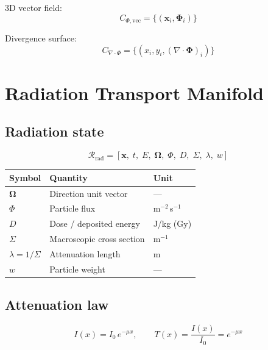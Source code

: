 \documentclass[11pt, a4paper, oneside]{article}
\newcommand{\xvec}{\mathbf{x}}
\newcommand{\Phivec}{\bm{\Phi}}
\newcommand{\Omvec}{\bm{\Omega}}         %
\begin{document}
3D vector field:
\begin{equation}
  C_{\Phi,\mathrm{vec}} = \{(\xvec_i, \Phivec_i)\}
  \label{eq:c_fluxvec}
\end{equation}

Divergence surface:
\begin{equation}
  C_{\nabla\cdot\Phi} = \{(x_i, y_i, (\nabla\cdot\Phivec)_i)\}
  \label{eq:c_div}
\end{equation}

\section{Radiation Transport Manifold}
\label{sec:radiation}

\subsection{Radiation state}

\begin{equation}
  \mathcal{R}_{\mathrm{rad}} = [\xvec,\; t,\; E,\; \Omvec,\;
                                  \Phi,\; D,\; \Sigma,\; \lambda,\; w]
  \label{eq:rad_state}
\end{equation}

\begin{center}
\begin{tabular}{lll}
  \toprule
  Symbol & Quantity & Unit \\
  \midrule
  $\Omvec$ & Direction unit vector & --- \\
  $\Phi$   & Particle flux         & m$^{-2}$\,s$^{-1}$ \\
  $D$      & Dose / deposited energy & J/kg (Gy) \\
  $\Sigma$ & Macroscopic cross section & m$^{-1}$ \\
  $\lambda = 1/\Sigma$ & Attenuation length & m \\
  $w$      & Particle weight & --- \\
  \bottomrule
\end{tabular}
\end{center}

\subsection{Attenuation law}

\begin{equation}
  I(x) = I_0\, e^{-\mu x}, \qquad
  T(x) = \frac{I(x)}{I_0} = e^{-\mu x}
  \label{eq:attenuation}
\end{equation}
\end{document}
